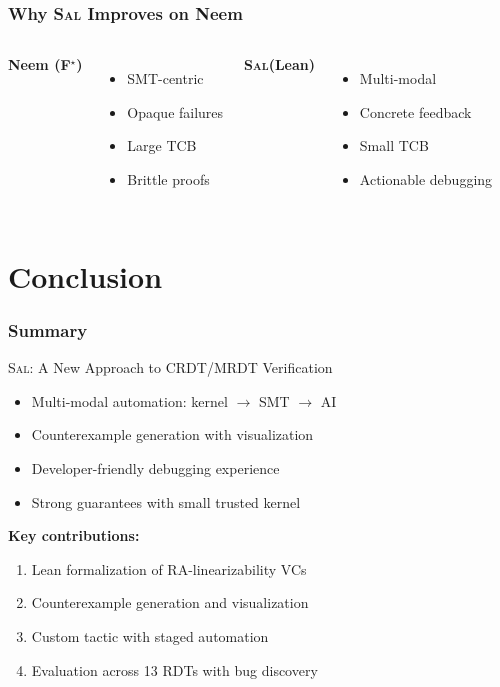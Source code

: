 \documentclass[usepdftitle=false]{beamer}
\newcommand{\sal}{\textsc{Sal}\xspace}
\newcommand{\fstar}{F$^{\star}$\xspace}
\begin{document}
\begin{frame}
  \frametitle{Why \sal Improves on Neem}
  
  \begin{columns}
    \textbf{Neem (\fstar)}
    \begin{itemize}
      \item SMT-centric
      \item Opaque failures
      \item Large TCB
      \item Brittle proofs
    \end{itemize}
    
    \textbf{\sal (Lean)}
    \begin{itemize}
      \item Multi-modal
      \item Concrete feedback
      \item Small TCB
      \item Actionable debugging
    \end{itemize}
  \end{columns}
\end{frame}

\section{Conclusion}

\begin{frame}
  \frametitle{Summary}
  
  \begin{block}{\sal: A New Approach to CRDT/MRDT Verification}
    \begin{itemize}
      \item Multi-modal automation: kernel $\to$ SMT $\to$ AI
      \item Counterexample generation with visualization
      \item Developer-friendly debugging experience
      \item Strong guarantees with small trusted kernel
    \end{itemize}
  \end{block}
  
  \vspace{0.3cm}
  \textbf{Key contributions:}
  \begin{enumerate}
    \item Lean formalization of RA-linearizability VCs
    \item Counterexample generation and visualization
    \item Custom tactic with staged automation
    \item Evaluation across 13 RDTs with bug discovery
  \end{enumerate}
\end{frame}
\end{document}
